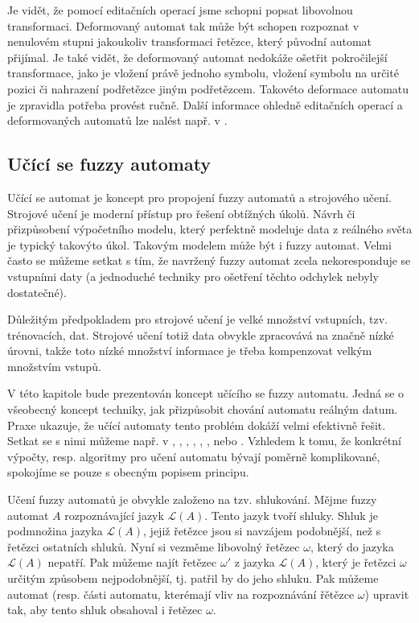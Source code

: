 \documentclass[a4paper,10pt]{article}
\begin{document}
Je vidět, že pomocí editačních operací jsme schopni popsat libovolnou transformaci. Deformovaný automat tak může být schopen rozpoznat v nenulovém stupni jakoukoliv transformaci řetězce, který původní automat přijímal. Je také vidět, že deformovaný automat nedokáže ošetřit pokročilejší transformace, jako je vložení právě jednoho symbolu, vložení symbolu na určité pozici či nahrazení podřetězce jiným podřetězcem. Takovéto deformace automatu je zpravidla potřeba provést ručně. Další informace ohledně editačních operací a deformovaných automatů lze nalést např. v \cite{AstGonMenGar-FuzzAutEpsMovCmpFuzzMeasBtwStrs}.

\subsection{Učící se fuzzy automaty}
Učící se automat je koncept pro propojení fuzzy automatů a strojového učení. Strojové učení je moderní přístup pro řešení obtížných úkolů. Návrh či přizpůsobení výpočetního modelu, který perfektně modeluje data z reálného světa je typický takovýto úkol. Takovým modelem může být i fuzzy automat. Velmi často se můžeme setkat s tím, že navržený fuzzy automat zcela nekoresponduje se vstupními daty (a jednoduché techniky pro ošetření těchto odchylek nebyly dostatečné). 

Důležitým předpokladem pro strojové učení je velké množství vstupních, tzv. trénovacích, dat. Strojové učení totiž data obvykle zpracovává na značně nízké úrovni, takže toto nízké množství informace je třeba kompenzovat velkým množstvím vstupů.

V této kapitole bude prezentován koncept učícího se fuzzy automatu. Jedná se o všeobecný koncept techniky, jak přizpůsobit chování automatu reálným datum. Praxe ukazuje, že učící automaty tento problém dokáží velmi efektivně řešit. Setkat se s nimi můžeme např. v \cite{FuLi-ForLeaAutAutGam}, \cite{WeeFu-FormFuzAutAppModLeaSys}, \cite{GilOmlTho-EquKnoRep+}, \cite{TzaRig-StaAnaAdaFuzzConSysUsiPetrNetLeaAut}, \cite{PatMor-EdgDetTecFuzzLogCEllLeaAutFuzzImPro}, \cite{MarMeySol-HybMetGasDifModFuzCelAutImSha}, \cite{SinGha+HybrEdgDetMetFuzSetTheCelLeaAut} \cite{AstGariGonVillFar-ApprStrMatUsiDefFuzzAutLearExpr} nebo \cite{ZhiMinLan-EvoStraIndFuFiStaAu}. Vzhledem k tomu, že konkrétní výpočty, resp. algoritmy pro učení automatu bývají poměrně komplikované, spokojíme se pouze s obecným popisem principu.

Učení fuzzy automatů je obvykle založeno na tzv. shlukování. Mějme fuzzy automat $A$ rozpoznávající jazyk  $\mathcal{L}(A)$. Tento jazyk tvoří shluky. Shluk je podmnožina jazyka $\mathcal{L}(A)$, jejiž řetězce jsou si navzájem podobnější, než s řetězci ostatních shluků. Nyní si vezměme libovolný řetězec $\omega$, který do jazyka $\mathcal{L}(A)$ nepatří. Pak můžeme najít řetězec $\omega'$ z jazyka $\mathcal{L}(A)$, který je řetězci $\omega$ určitým způsobem nejpodobnější, tj. patřil by do jeho shluku. Pak můžeme automat (resp. části automatu, kterémají vliv na rozpoznávání řětězce $\omega$) upravit tak, aby tento shluk obsahoval i řetězec $\omega$.
\end{document}

